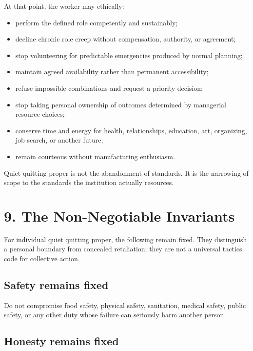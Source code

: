 \documentclass[11pt,oneside]{article}
\providecommand{\tightlist}{%
  \setlength{\itemsep}{0.22em}\setlength{\parskip}{0pt}}
\begin{document}
At that point, the worker may ethically:

\begin{itemize}
\tightlist
\item
  perform the defined role competently and sustainably;
\item
  decline chronic role creep without compensation, authority, or
  agreement;
\item
  stop volunteering for predictable emergencies produced by normal
  planning;
\item
  maintain agreed availability rather than permanent accessibility;
\item
  refuse impossible combinations and request a priority decision;
\item
  stop taking personal ownership of outcomes determined by managerial
  resource choices;
\item
  conserve time and energy for health, relationships, education, art,
  organizing, job search, or another future;
\item
  remain courteous without manufacturing enthusiasm.
\end{itemize}

Quiet quitting proper is not the abandonment of standards. It is the
narrowing of scope to the standards the institution actually resources.

\hypertarget{the-non-negotiable-invariants}{%
\section{9. The Non-Negotiable
Invariants}\label{the-non-negotiable-invariants}}

For individual quiet quitting proper, the following remain fixed. They
distinguish a personal boundary from concealed retaliation; they are not
a universal tactics code for collective action.

\hypertarget{safety-remains-fixed}{%
\subsection{Safety remains fixed}\label{safety-remains-fixed}}

Do not compromise food safety, physical safety, sanitation, medical
safety, public safety, or any other duty whose failure can seriously
harm another person.

\hypertarget{honesty-remains-fixed}{%
\subsection{Honesty remains fixed}\label{honesty-remains-fixed}}
\end{document}
